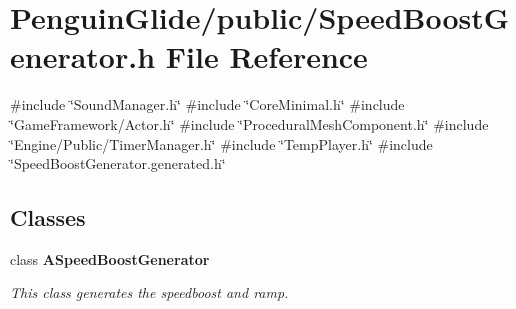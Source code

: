 \section{Penguin\+Glide/public/\+Speed\+Boost\+Generator.h File Reference}
\label{_speed_boost_generator_8h}
{\ttfamily \#include \char`\"{}Sound\+Manager.\+h\char`\"{}}\newline
{\ttfamily \#include \char`\"{}Core\+Minimal.\+h\char`\"{}}\newline
{\ttfamily \#include \char`\"{}Game\+Framework/\+Actor.\+h\char`\"{}}\newline
{\ttfamily \#include \char`\"{}Procedural\+Mesh\+Component.\+h\char`\"{}}\newline
{\ttfamily \#include \char`\"{}Engine/\+Public/\+Timer\+Manager.\+h\char`\"{}}\newline
{\ttfamily \#include \char`\"{}Temp\+Player.\+h\char`\"{}}\newline
{\ttfamily \#include \char`\"{}Speed\+Boost\+Generator.\+generated.\+h\char`\"{}}\newline
\subsection*{Classes}
\begin{DoxyCompactItemize}
\item 
class \textbf{ A\+Speed\+Boost\+Generator}
\begin{DoxyCompactList}\small\item\em This class generates the speedboost and ramp. \end{DoxyCompactList}\end{DoxyCompactItemize}
